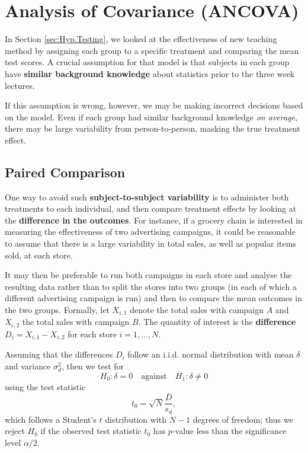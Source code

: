 \section{Analysis of Covariance (ANCOVA)}\label{ANCOVA}
In Section \ref{sec:Hyp.Testing}, we looked at the effectiveness of new teaching method by assigning each group to a specific treatment and comparing the mean test scores. A crucial assumption for that model is that subjects in each group have \textbf{similar background knowledge} about statistics prior to the three week lectures. \par If this assumption is wrong, however, we may be making incorrect decisions based on the model. Even if each group had similar background knowledge \textit{on average}, there may be large variability from person-to-person, masking the true treatment effect.

\subsection{Paired Comparison}
One way to avoid such \textbf{subject-to-subject variability} is to administer both treatments to each individual,  and then compare treatment effects by looking at the \textbf{difference in the outcomes}. \newl For instance, if a grocery chain is interested in measuring the effectiveness of two advertising campaigns, it could be reasonable to assume that there is a large variability in total sales, as well as popular items sold, at each store. \par It may then be preferable to run both campaigns in each store and analyse the resulting data rather than to split the stores into two groups (in each of which a different advertising campaign is run) and then to compare the mean outcomes in the two groups. 
\newl Formally, let $X_{i,1}$ denote the total sales with campaign $A$ and $X_{i,2}$ the total sales with campaign $B$. The quantity of interest is the \textbf{difference} $D_{i}=X_{i,1}-X_{i,2}$ for each store $i=1,\ldots,N$. \par Assuming that the differences $D_{i}$ follow an {i.i.d.} normal distribution with mean $\delta$ and variance $\sigma^{2}_{d}$, then we  test for $$H_{0}: \delta=0\quad\mbox{against}\quad H_{1}: \delta \neq 0$$  using the test statistic $$t_0=\sqrt{N}\frac{\bar{D}}{s_{d}},$$ which follows a Student's $t$ distribution with  $N-1$ degrees of freedom; thus we reject $H_{0}$ if the observed test statistic $t_{0}$ has $p$-value less than the significance level $\alpha/2$.

